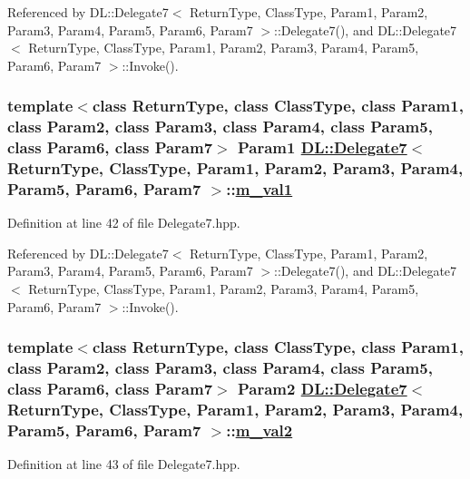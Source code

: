 Referenced by DL::Delegate7$<$ Return\-Type, Class\-Type, Param1, Param2, Param3, Param4, Param5, Param6, Param7 $>$::Delegate7(), and DL::Delegate7$<$ Return\-Type, Class\-Type, Param1, Param2, Param3, Param4, Param5, Param6, Param7 $>$::Invoke().\hypertarget{classDL_1_1Delegate7_r2}{
\subsubsection[m\_\-val1]{\setlength{\rightskip}{0pt plus 5cm}template$<$class Return\-Type, class Class\-Type, class Param1, class Param2, class Param3, class Param4, class Param5, class Param6, class Param7$>$ Param1 \hyperlink{classDL_1_1Delegate7}{DL::Delegate7}$<$ Return\-Type, Class\-Type, Param1, Param2, Param3, Param4, Param5, Param6, Param7 $>$::\hyperlink{classDL_1_1Delegate7_r2}{m\_\-val1}}}
\label{classDL_1_1Delegate7_r2}




Definition at line 42 of file Delegate7.hpp.

Referenced by DL::Delegate7$<$ Return\-Type, Class\-Type, Param1, Param2, Param3, Param4, Param5, Param6, Param7 $>$::Delegate7(), and DL::Delegate7$<$ Return\-Type, Class\-Type, Param1, Param2, Param3, Param4, Param5, Param6, Param7 $>$::Invoke().\hypertarget{classDL_1_1Delegate7_r3}{
\subsubsection[m\_\-val2]{\setlength{\rightskip}{0pt plus 5cm}template$<$class Return\-Type, class Class\-Type, class Param1, class Param2, class Param3, class Param4, class Param5, class Param6, class Param7$>$ Param2 \hyperlink{classDL_1_1Delegate7}{DL::Delegate7}$<$ Return\-Type, Class\-Type, Param1, Param2, Param3, Param4, Param5, Param6, Param7 $>$::\hyperlink{classDL_1_1Delegate7_r3}{m\_\-val2}}}
\label{classDL_1_1Delegate7_r3}




Definition at line 43 of file Delegate7.hpp.

